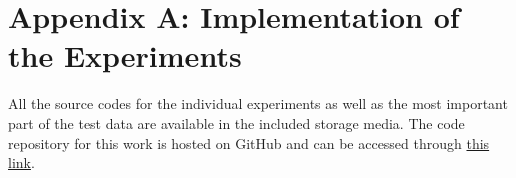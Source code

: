 \chapter*{Appendix A: Implementation of the Experiments}
\label{kap:apendA}

All the source codes for the individual experiments as well as the most important
part of the test data are available in the included storage media. The code
repository for this work is hosted on GitHub and can be accessed through \href{https://github.com/Aj0SK/bachelor_thesis}{this link}.
